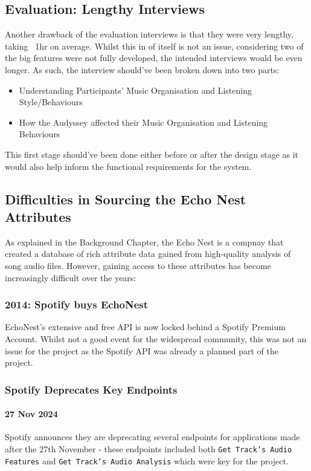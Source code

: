 \subsection{Evaluation: Lengthy Interviews} %
Another drawback of the evaluation interviews is that they were very lengthy, taking ~1hr on average. Whilst this in of itself is not an issue, considering two of the big features were not fully developed, the intended interviews would be even longer. As such, the interview should've been broken down into two parts:\begin{itemize}
    \item Understanding Participants' Music Organisation and Listening Style/Behaviours
    \item How the Audyssey affected their Music Organisation and Listening Behaviours
\end{itemize}
This first stage should've been done either before or after the design stage as it would also help inform the functional requirements for the system.

\subsection{Difficulties in Sourcing the Echo Nest Attributes}
As explained in the Background Chapter, the Echo Nest is a compnay that created a database of rich attribute data gained from high-quality analysis of song audio files. However, gaining access to these attributes has become increasingly difficult over the years:

\subsubsection{2014: Spotify buys EchoNest} EchoNest's extensive and free API is now locked behind a Spotify Premium Account. Whilst not a good event for the widespread community, this was not an issue for the project as the Spotify API was already a planned part of the project.

\subsubsection{Spotify Deprecates Key Endpoints}
\paragraph{27 Nov 2024} Spotify announces they are deprecating several endpoints for applications made after the 27th November - these endpoints included both \texttt{Get Track's Audio Features} and \texttt{Get Track's Audio Analysis} which were key for the project.

